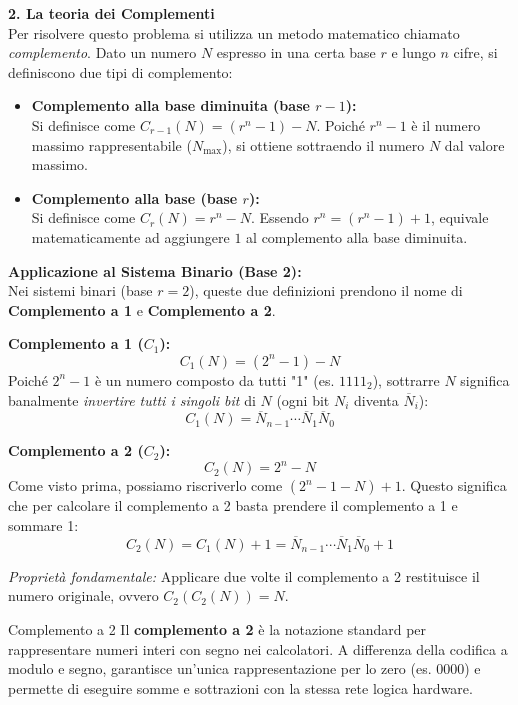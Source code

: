 \textbf{2. La teoria dei Complementi}\\
Per risolvere questo problema si utilizza un metodo matematico chiamato \emph{complemento}. Dato un numero $N$ espresso in una certa base $r$ e lungo $n$ cifre, si definiscono due tipi di complemento:
\begin{itemize}
    \item \textbf{Complemento alla base diminuita (base $r-1$):} \\
    Si definisce come $C_{r-1}(N) = (r^n - 1) - N$. Poiché $r^n - 1$ è il numero massimo rappresentabile ($N_{\max}$), si ottiene sottraendo il numero $N$ dal valore massimo.
    \item \textbf{Complemento alla base (base $r$):} \\
    Si definisce come $C_r(N) = r^n - N$. Essendo $r^n = (r^n - 1) + 1$, equivale matematicamente ad aggiungere $1$ al complemento alla base diminuita.
\end{itemize}

\textbf{Applicazione al Sistema Binario (Base 2):}\\
Nei sistemi binari (base $r=2$), queste due definizioni prendono il nome di \textbf{Complemento a 1} e \textbf{Complemento a 2}.

\textbf{Complemento a 1 ($C_1$):}
\[ C_1(N) = (2^n - 1) - N \]
Poiché $2^n-1$ è un numero composto da tutti "1" (es. $1111_2$), sottrarre $N$ significa banalmente \emph{invertire tutti i singoli bit} di $N$ (ogni bit $N_i$ diventa $\overline{N}_i$):
\[ C_1(N) = \overline{N}_{n-1}\cdots\overline{N}_1\overline{N}_0 \]

\textbf{Complemento a 2 ($C_2$):}
\[ C_2(N) = 2^n - N \]
Come visto prima, possiamo riscriverlo come $(2^n - 1 - N) + 1$. Questo significa che per calcolare il complemento a 2 basta prendere il complemento a 1 e sommare 1:
\[ C_2(N) = C_1(N) + 1 = \overline{N}_{n-1}\cdots\overline{N}_1\overline{N}_0 + 1 \]

\noindent\textit{Proprietà fondamentale:} Applicare due volte il complemento a 2 restituisce il numero originale, ovvero $C_2(C_2(N)) = N$.

\begin{definizione}{Complemento a 2}
Il \textbf{complemento a 2} è la notazione standard per rappresentare numeri interi con segno nei calcolatori. A differenza della codifica a modulo e segno, garantisce un'unica rappresentazione per lo zero (es. $0000$) e permette di eseguire somme e sottrazioni con la stessa rete logica hardware.
\end{definizione}

